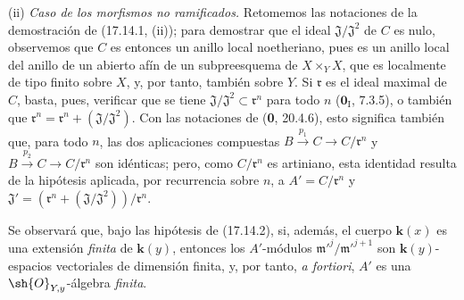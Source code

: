 (ii) \emph{Caso de los morfismos no ramificados.} Retomemos las notaciones de la demostración de (17.14.1, (ii)); para demostrar que el ideal $\mathfrak{J}/\mathfrak{J}^2$ de $C$ es nulo, observemos que $C$ es entonces un anillo local noetheriano, pues es un anillo local del anillo de un abierto afín de un subpreesquema de $X\times_YX$, que es localmente de tipo finito sobre $X$, y, por tanto, también sobre $Y$. Si $\mathfrak r$ es el ideal maximal de $C$, basta, pues, verificar que se tiene $\mathfrak{J}/\mathfrak{J}^2\subset\mathfrak r^n$ para todo $n$ ($\mathbf{0}_{\mathrm I}$, 7.3.5), o también que $\mathfrak r^n=\mathfrak r^n+(\mathfrak{J}/\mathfrak{J}^2)$. Con las notaciones de (\textbf 0, 20.4.6), esto significa también que, para todo $n$, las dos aplicaciones compuestas $B\xrightarrow{p_1}C\to C/\mathfrak r^n$ y $B\xrightarrow{p_2}C\to C/\mathfrak r^n$ son idénticas; pero, como $C/\mathfrak r^n$ es artiniano, esta identidad resulta de la hipótesis aplicada, por recurrencia sobre $n$, a $A'=C/\mathfrak r^n$ y $\mathfrak{J}'=(\mathfrak r^n+(\mathfrak{J}/\mathfrak{J}^2))/\mathfrak r^n$.

\begin{remark}[17.14.3]
\label{IV.17.14.3}
Se observará que, bajo las hipótesis de (17.14.2), si, además, el cuerpo $\boldsymbol{k}(x)$ es una extensión \emph{finita} de $\boldsymbol{k}(y)$, entonces los $A'$-módulos $\mathfrak m'^{j}/\mathfrak m'^{j+1}$ son $\boldsymbol{k}(y)$-espacios vectoriales de dimensión finita, y, por tanto, \emph{a fortiori}, $A'$ es una $\sh{O}_{Y,y}$-álgebra \emph{finita}.
\end{remark}
